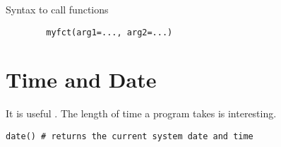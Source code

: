 Syntax to call functions
\begin{myindentpar}{1cm}
\begin{verbatim}
        myfct(arg1=..., arg2=...)
\end{verbatim}
\end{myindentpar}


\section{Time and Date}
It is useful . The length of time a program takes is interesting.


\begin{myindentpar}{1cm}
\begin{verbatim}
date() # returns the current system date and time
\end{verbatim}
\end{myindentpar}



\newpage
